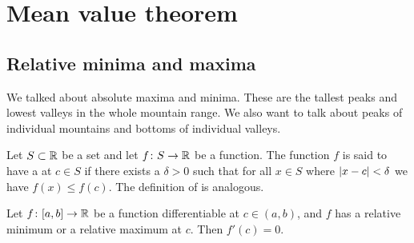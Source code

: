 
\sectionnewpage
\section{Mean value theorem}
\label{sec:mvt}


\subsection{Relative minima and maxima}

We talked about absolute maxima and minima.  These are the tallest peaks and
lowest valleys in the whole mountain range.  We also want to talk
about peaks of individual mountains and bottoms of individual valleys.

\begin{defn}
Let $S \subset {\mathbb{R}}$ be a set and
let $f \colon S \to {\mathbb{R}}$ be a function.  The function $f$ is said to have
a \emph{} at $c \in S$ if there exists a $\delta>0$
such that for all $x \in S$ where $\left\lvert {x-c} \right\rvert < \delta$
we have $f(x) \leq f(c)$.  The definition of \emph{} is analogous.
\end{defn}

\begin{lemma}\label{relminmax:lemma}
Let $f \colon [a,b] \to {\mathbb{R}}$ be a function differentiable at $c \in (a,b)$,
and $f$ has
a relative minimum or a relative maximum at $c$.  Then
$f'(c) = 0$.
\end{lemma}

